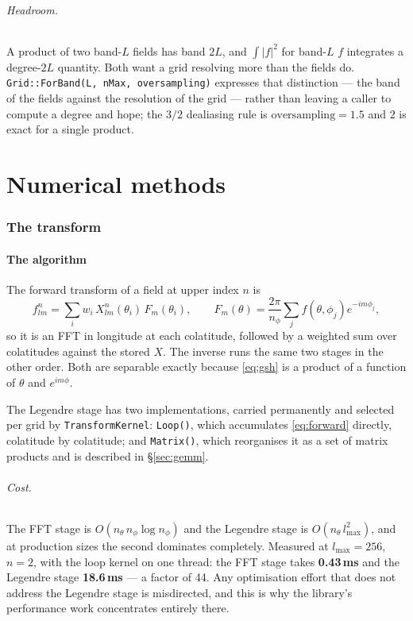 \documentclass[11pt,a4paper]{article}
\newcommand{\code}[1]{\texttt{#1}}
\begin{document}
\paragraph{Headroom.}  A product of two band-$L$ fields has band $2L$, and
$\int|f|^2$ for band-$L$ $f$ integrates a degree-$2L$ quantity.  Both want
a grid resolving more than the fields do.  \code{Grid::ForBand(L, nMax,
oversampling)} expresses that distinction --- the band of the fields
against the resolution of the grid --- rather than leaving a caller to
compute a degree and hope; the $3/2$ dealiasing rule is
$\text{oversampling}=1.5$ and $2$ is exact for a single product.

\part{Numerical methods}
\label{part:numerics}

\section{The transform}
\label{sec:transform}

\subsection{The algorithm}

The forward transform of a field at upper index $n$ is
\begin{equation}
  f^{n}_{lm} = \sum_{i} w_i\, X^{n}_{lm}(\theta_i)\, F_m(\theta_i),
  \qquad
  F_m(\theta) = \frac{2\pi}{n_\phi}\sum_{j} f(\theta,\phi_j) e^{-im\phi_j},
  \label{eq:forward}
\end{equation}
so it is an FFT in longitude at each colatitude, followed by a weighted
sum over colatitudes against the stored $X$.  The inverse runs the same
two stages in the other order.  Both are separable exactly because
\eqref{eq:gsh} is a product of a function of $\theta$ and $e^{im\phi}$.

The Legendre stage has two implementations, carried permanently and
selected per grid by \code{TransformKernel}: \code{Loop()}, which
accumulates \eqref{eq:forward} directly, colatitude by colatitude; and
\code{Matrix()}, which reorganises it as a set of matrix products and is
described in \S\ref{sec:gemm}.

\paragraph{Cost.}  The FFT stage is $O(n_\theta\, n_\phi \log n_\phi)$ and
the Legendre stage is $O(n_\theta\, l_{\max}^2)$, and at production sizes
the second dominates completely.  Measured at $l_{\max}=256$, $n=2$, with
the loop kernel on one thread: the FFT stage takes \textbf{0.43\,ms} and
the Legendre stage \textbf{18.6\,ms} --- a factor of 44.  Any optimisation
effort that does not address the Legendre stage is misdirected, and this
is why the library's performance work concentrates entirely there.
\end{document}
